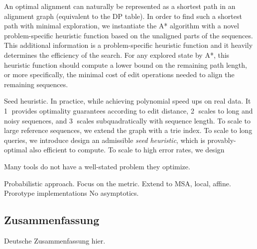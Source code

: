 An optimal alignment can naturally be represented as a shortest path in an
alignment graph (equivalent to the DP table). In order to find such a shortest
path with minimal exploration, we instantiate the A* algorithm with a novel
problem-specific heuristic function based on the unaligned parts of the
sequences. This additional information is a problem-specific heuristic function
and it heavily determines the efficiency of the search. For any explored state
by A*, this heuristic function should compute a lower bound on the remaining
path length, or more specifically, the minimal cost of edit operations needed to
align the remaining sequences.

Seed heuristic. In practice, while achieving polynomial speed ups on real data.
It \textcircled{1} provides optimality guarantees according to edit distance,
\textcircled{2} scales to long and noisy sequences, and \textcircled{3} scales
subquadratically with sequence length. To scale to large reference sequences, we
extend the graph with a trie index. To scale to long queries, we introduce
design an admissible \emph{seed heuristic}, which is provably-optimal also
efficient to compute. To scale to high error rates, we design  

Many tools do not have a well-stated problem they optimize.

Probabilistic approach.
Focus on the metric.
Extend to MSA, local, affine.
Prorotype implementations
No asymptotics.


\endgroup

\cleardoublepage%

\begingroup
\let\clearpage\relax
\let\cleardoublepage\relax
\let\cleardoublepage\relax

\begin{otherlanguage}{ngerman}
\chapter*{Zusammenfassung}

Deutsche Zusammenfassung hier.

\end{otherlanguage}

\endgroup

\vfill